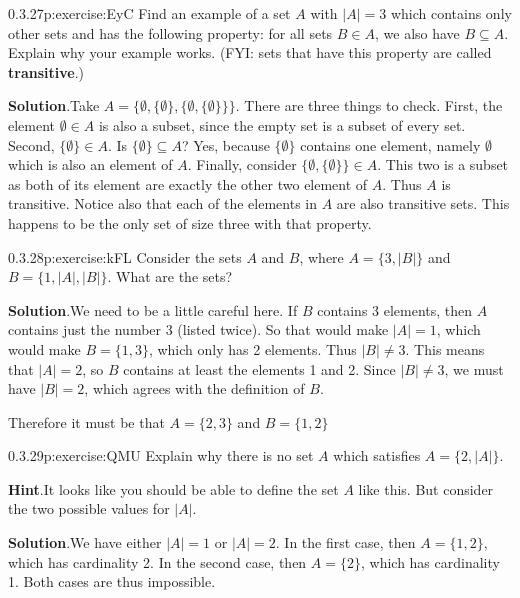 \documentclass[twoside,11pt,]{book}
\newcommand{\blocktitlefont}{\relax}
\newcommand{\terminology}[1]{\textbf{#1}}
\numberwithin{equation}{chapter}
\newcommand{\card}[1]{\left| #1 \right|}
\begin{document}
\begin{divisionsolution}{0.3.27}{}{p:exercise:EyC}%
Find an example of a set \(A\) with \(|A| = 3\) which contains only other sets and has the following property: for all sets \(B \in A\), we also have \(B \subseteq A\). Explain why your example works. (FYI: sets that have this property are called \terminology{transitive}.)%
\par\smallskip%
\noindent\textbf{\blocktitlefont Solution}.\quad{}Take \(A = \{\emptyset, \{\emptyset\}, \{\emptyset, \{\emptyset\}\}\}\). There are three things to check. First, the element \(\emptyset \in A\) is also a subset, since the empty set is a subset of every set. Second, \(\{\emptyset\}\in A\). Is \(\{\emptyset\} \subseteq A\)? Yes, because \(\{\emptyset\}\) contains one element, namely \(\emptyset\) which is also an element of \(A\). Finally, consider \(\{\emptyset, \{\emptyset\}\}\in A\). This two is a subset as both of its element are exactly the other two element of \(A\). Thus \(A\) is transitive. Notice also that each of the elements in \(A\) are also transitive sets. This happens to be the only set of size three with that property.%
\end{divisionsolution}%
\begin{divisionsolution}{0.3.28}{}{p:exercise:kFL}%
Consider the sets \(A\) and \(B\), where \(A = \{3, |B|\}\) and \(B = \{1, |A|, |B|\}\).  What are the sets?%
\par\smallskip%
\noindent\textbf{\blocktitlefont Solution}.\quad{}We need to be a little careful here.  If \(B\) contains 3 elements, then \(A\) contains just the number 3 (listed twice).  So that would make \(|A| = 1\), which would make \(B = \{1, 3\}\), which only has 2 elements.  Thus \(|B| \ne 3\).  This means that \(|A| = 2\), so \(B\) contains at least the elements 1 and 2.  Since \(\card{B} \ne 3\), we must have \(\card{B} = 2\), which agrees with the definition of \(B\).%
\par
Therefore it must be that \(A = \{2,3\}\) and \(B = \{1, 2\}\)%
\end{divisionsolution}%
\begin{divisionsolution}{0.3.29}{}{p:exercise:QMU}%
Explain why there is no set \(A\) which satisfies \(A = \{2, \card{A}\}\).%
\par\smallskip%
\noindent\textbf{\blocktitlefont Hint}.\quad{}It looks like you should be able to define the set \(A\) like this.  But consider the two possible values for \(\card{A}\).%
\par\smallskip%
\noindent\textbf{\blocktitlefont Solution}.\quad{}We have either \(\card{A} = 1\) or \(\card{A} = 2\).  In the first case, then \(A = \{1,2\}\), which has cardinality 2.  In the second case, then \(A = \{2\}\), which has cardinality 1.  Both cases are thus impossible.%
\end{divisionsolution}%
\end{document}
